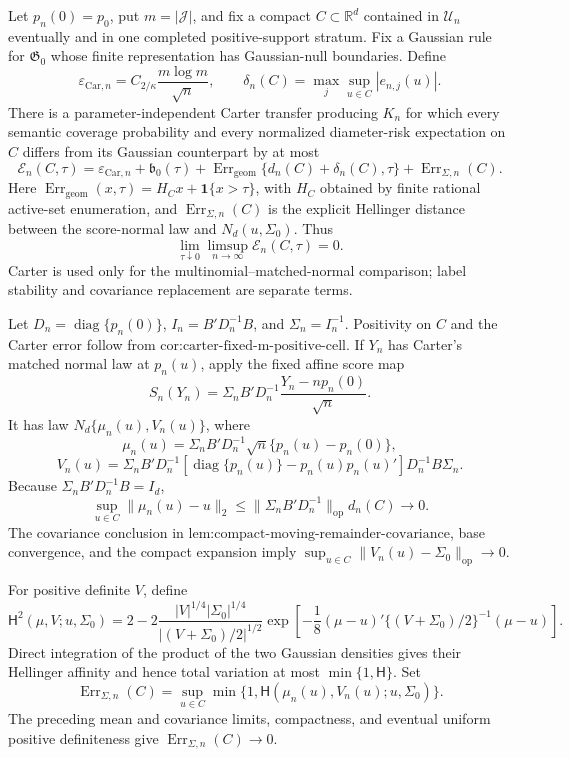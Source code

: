 Let \(p_n(0)=p_0\), put \(m=|\mathcal J|\), and fix a compact \(C\subset\mathbb R^d\) contained in \(\mathcal U_n\) eventually and in one completed positive-support stratum. Fix a Gaussian rule for \(\mathfrak G_0\) whose finite representation has Gaussian-null boundaries. Define
\[
 \varepsilon_{\mathrm{Car},n}=C_{2/\kappa}\frac{m\log m}{\sqrt n},
 \qquad
 \delta_n(C)=\max_j\sup_{u\in C}|e_{n,j}(u)|.
\]
There is a parameter-independent Carter transfer producing \(K_n\) for which every semantic coverage probability and every normalized diameter-risk expectation on \(C\) differs from its Gaussian counterpart by at most
\[
 \mathcal E_n(C,\tau)=
 \varepsilon_{\mathrm{Car},n}+\mathfrak b_0(\tau)
 +\operatorname{Err}_{\mathrm{geom}}\{d_n(C)+\delta_n(C),\tau\}
 +\operatorname{Err}_{\Sigma,n}(C).
\]
Here \(\operatorname{Err}_{\mathrm{geom}}(x,\tau)=H_Cx+\mathbf 1\{x>\tau\}\), with \(H_C\) obtained by finite rational active-set enumeration, and \(\operatorname{Err}_{\Sigma,n}(C)\) is the explicit Hellinger distance between the score-normal law and \(N_d(u,\Sigma_0)\). Thus
\[
 \lim_{\tau\downarrow0}\limsup_{n\to\infty}\mathcal E_n(C,\tau)=0.
\]
Carter is used only for the multinomial--matched-normal comparison; label stability and covariance replacement are separate terms.

Let \(D_n=\operatorname{diag}\{p_n(0)\}\), \(I_n=B'D_n^{-1}B\), and \(\Sigma_n=I_n^{-1}\). Positivity on \(C\) and the Carter error follow from \(\text{cor:carter-fixed-m-positive-cell}\). If \(Y_n\) has Carter's matched normal law at \(p_n(u)\), apply the fixed affine score map
\[
 S_n(Y_n)=\Sigma_nB'D_n^{-1}\frac{Y_n-np_n(0)}{\sqrt n}.
\]
It has law \(N_d\{\mu_n(u),V_n(u)\}\), where
\[
 \mu_n(u)=\Sigma_nB'D_n^{-1}\sqrt n\{p_n(u)-p_n(0)\},
\]
\[
 V_n(u)=\Sigma_nB'D_n^{-1}
 [\operatorname{diag}\{p_n(u)\}-p_n(u)p_n(u)']D_n^{-1}B\Sigma_n.
\]
Because \(\Sigma_nB'D_n^{-1}B=I_d\),
\[
 \sup_{u\in C}\|\mu_n(u)-u\|_2
 \le \|\Sigma_nB'D_n^{-1}\|_{\mathrm{op}}d_n(C)\longrightarrow0.
\]
The covariance conclusion in \(\text{lem:compact-moving-remainder-covariance}\), base convergence, and the compact expansion imply \(\sup_{u\in C}\|V_n(u)-\Sigma_0\|_{\mathrm{op}}\to0\).

For positive definite \(V\), define
\[
 \mathsf H^2(\mu,V;u,\Sigma_0)=2-2
 \frac{|V|^{1/4}|\Sigma_0|^{1/4}}
 {|(V+\Sigma_0)/2|^{1/2}}
 \exp\left[-\frac18(\mu-u)'\{(V+\Sigma_0)/2\}^{-1}(\mu-u)\right].
\]
Direct integration of the product of the two Gaussian densities gives their Hellinger affinity and hence total variation at most \(\min\{1,\mathsf H\}\). Set
\[
 \operatorname{Err}_{\Sigma,n}(C)=
 \sup_{u\in C}\min\{1,\mathsf H(\mu_n(u),V_n(u);u,\Sigma_0)\}.
\]
The preceding mean and covariance limits, compactness, and eventual uniform positive definiteness give \(\operatorname{Err}_{\Sigma,n}(C)\to0\).

